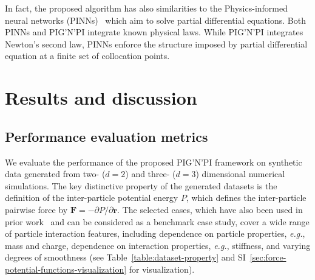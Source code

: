 \documentclass{article}
\newcommand{\pignpi}{PIG'N'PI\xspace}
\newcommand{\potEnergy}{P}
\newcommand{\force}{\bm{F}}
\newcommand{\position}{\bm{r}}
\newcommand{\APPENDIX}{SI} %
\begin{document}
In fact, the proposed algorithm has also  similarities to the Physics-informed neural networks (PINNs)~\cite{karniadakis2021physics} which aim to solve partial differential equations. Both PINNs and \pignpi integrate known physical laws. While \pignpi integrates Newton's second law, PINNs enforce the structure imposed by partial differential equation  at a finite set of collocation points.



\section{Results and discussion}
\label{sec:experiment}

\subsection{Performance evaluation metrics}
\label{sec:performance_evaluation}

We evaluate the performance of the proposed \pignpi framework on synthetic data generated from two- ($d=2$) and three- ($d=3$) dimensional numerical simulations. The key distinctive property of the generated datasets is the definition of the inter-particle potential energy $\potEnergy$, which defines the inter-particle pairwise force by $\force = -\partial \potEnergy / \partial \position$. The selected cases, which have also been used in prior work~\cite{cranmer2020discovering} and can be considered as a benchmark case study, cover a wide range of particle interaction features, including dependence on particle properties, \textit{e.g.}, mass and charge, dependence on interaction properties, \textit{e.g.}, stiffness, and varying degrees of smoothness (see Table~\ref{table:dataset-property} and \APPENDIX~\ref{sec:force-potential-functions-visualization} for visualization). 



\end{document}
